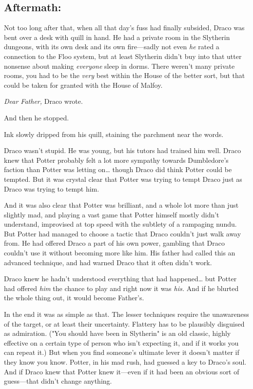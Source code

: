 \subsection{Aftermath:}

Not too long after that, when all that day's fuss had finally subsided, Draco
was bent over a desk with quill in hand. He had a private room in the Slytherin
dungeons, with its own desk and its own fire---sadly not even \emph{he} rated a
connection to the Floo system, but at least Slytherin didn't buy into that
utter nonsense about making \emph{everyone} sleep in dorms. There weren't many
private rooms, you had to be the \emph{very} best within the House of the
better sort, but that could be taken for granted with the House of Malfoy.

\emph{Dear Father,} Draco wrote.

And then he stopped.

Ink slowly dripped from his quill, staining the parchment near the words.

Draco wasn't stupid. He was young, but his tutors had trained him well. Draco
knew that Potter probably felt a lot more sympathy towards Dumbledore's faction
than Potter was letting on{\ldots} though Draco did think Potter could be
tempted. But it was crystal clear that Potter was trying to tempt Draco just as
Draco was trying to tempt him.

And it was also clear that Potter was brilliant, and a whole lot more than just
slightly mad, and playing a vast game that Potter himself mostly didn't
understand, improvised at top speed with the subtlety of a rampaging nundu. But
Potter had managed to choose a tactic that Draco couldn't just walk away from.
He had offered Draco a part of his own power, gambling that Draco couldn't use
it without becoming more like him. His father had called this an advanced
technique, and had warned Draco that it often didn't work.

Draco knew he hadn't understood everything that had happened{\ldots} but Potter
had offered \emph{him} the chance to play and right now it was \emph{his.} And
if he blurted the whole thing out, it would become Father's.

In the end it was as simple as that. The lesser techniques require the
unawareness of the target, or at least their uncertainty. Flattery has to be
plausibly disguised as admiration. ("You should have been in Slytherin" is an
old classic, highly effective on a certain type of person who isn't expecting
it, and if it works you can repeat it.) But when you find someone's ultimate
lever it doesn't matter if they know you know. Potter, in his mad rush, had
guessed a key to Draco's soul. And if Draco knew that Potter knew it---even if
it had been an obvious sort of guess---that didn't change anything.

